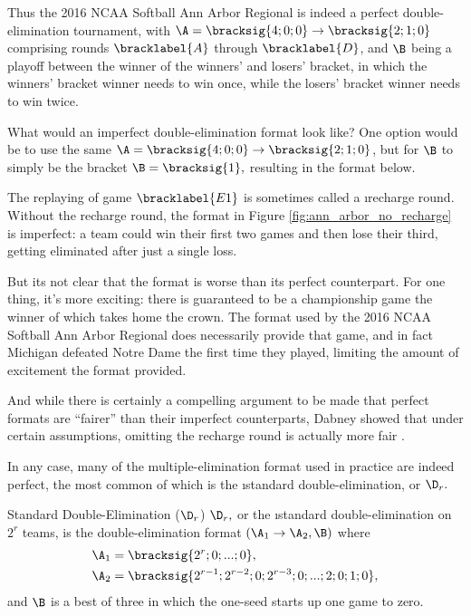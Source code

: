 {    Thus the 2016 NCAA Softball Ann Arbor Regional is indeed a perfect double-elimination tournament, with $\A = \bracksig{4;0;0} \to \bracksig{2;1;0}$ comprising rounds $\bracklabel{A}$ through $\bracklabel{D}$, and $\B$ being a playoff between the winner of the winners' and losers' bracket, in which the winners' bracket winner needs to win once, while the losers' bracket winner needs to win twice.

    What would an imperfect double-elimination format look like? One option would be to use the same $\A = \bracksig{4;0;0} \to \bracksig{2;1;0}$, but for $\B$ to simply be the bracket $\B = \bracksig{1},$ resulting in the format below.


    The replaying of game $\bracklabel{E1}$ is sometimes called a \i{recharge round}. Without the recharge round, the format in Figure \ref{fig:ann_arbor_no_recharge} is imperfect: a team could win their first two games and then lose their third, getting eliminated after just a single loss.

    But its not clear that the format is worse than its perfect counterpart. For one thing, it's more exciting: there is guaranteed to be a championship game the winner of which takes home the crown. The  format used by the 2016 NCAA Softball Ann Arbor Regional does necessarily provide that game, and in fact Michigan defeated Notre Dame the first time they played, limiting the amount of excitement the format provided.

    And while there is certainly a compelling argument to be made that perfect formats are ``fairer'' than their imperfect counterparts, Dabney showed that under certain assumptions, omitting the recharge round is actually more fair \cite{recharge_rounds}.

    In any case, many of the multiple-elimination format used in practice are indeed perfect, the most common of which is the \i{standard double-elimination}, or $\D_r.$

    \begin{definition}{Standard Double-Elimination ($\D_r$)}{}
        $\D_r,$ or the \i{standard double-elimination on $2^r$ teams}, is the double-elimination format $(\A_1 \to \A_2, \B)$ where
        \begin{align*}
            \A_1 &= \bracksig{2^r; 0; ... ; 0},\\
            \A_2 &= \bracksig{2^{r-1}; 2^{r-2}; 0; 2^{r-3}; 0; ...; 2; 0; 1; 0},
        \end{align*}
        and $\B$ is a best of three in which the one-seed starts up one game to zero.
    \end{definition}

}
